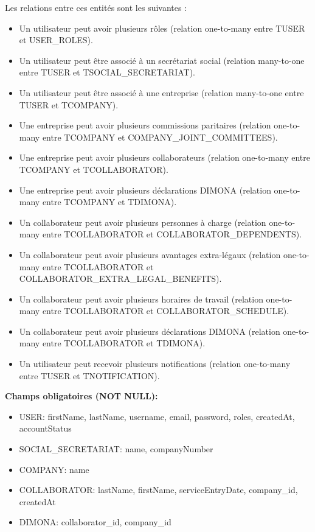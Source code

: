 \vspace{0.5cm}

\noindent Les relations entre ces entités sont les suivantes :

\begin{itemize}[leftmargin=*,label=\textcolor{darkgray}{$\bullet$},itemsep=0.3em]
  \item Un utilisateur peut avoir plusieurs rôles (relation one-to-many entre TUSER et USER\_ROLES).
  \item Un utilisateur peut être associé à un secrétariat social (relation many-to-one entre TUSER et TSOCIAL\_SECRETARIAT).
  \item Un utilisateur peut être associé à une entreprise (relation many-to-one entre TUSER et TCOMPANY).
  \item Une entreprise peut avoir plusieurs commissions paritaires (relation one-to-many entre TCOMPANY et COMPANY\_JOINT\_COMMITTEES).
  \item Une entreprise peut avoir plusieurs collaborateurs (relation one-to-many entre TCOMPANY et TCOLLABORATOR).
  \item Une entreprise peut avoir plusieurs déclarations DIMONA (relation one-to-many entre TCOMPANY et TDIMONA).
  \item Un collaborateur peut avoir plusieurs personnes à charge (relation one-to-many entre TCOLLABORATOR et COLLABORATOR\_DEPENDENTS).
  \item Un collaborateur peut avoir plusieurs avantages extra-légaux (relation one-to-many entre TCOLLABORATOR et COLLABORATOR\_EXTRA\_LEGAL\_BENEFITS).
  \item Un collaborateur peut avoir plusieurs horaires de travail (relation one-to-many entre TCOLLABORATOR et COLLABORATOR\_SCHEDULE).
  \item Un collaborateur peut avoir plusieurs déclarations DIMONA (relation one-to-many entre TCOLLABORATOR et TDIMONA).
  \item Un utilisateur peut recevoir plusieurs notifications (relation one-to-many entre TUSER et TNOTIFICATION).
\end{itemize}

\vspace{0.5cm}

\textbf{Champs obligatoires (NOT NULL):}
\begin{itemize}[leftmargin=*,label=\textcolor{darkgray}{$\bullet$},itemsep=0.3em]
  \item USER: firstName, lastName, username, email, password, roles, createdAt, accountStatus
  \item SOCIAL\_SECRETARIAT: name, companyNumber
  \item COMPANY: name
  \item COLLABORATOR: lastName, firstName, serviceEntryDate, company\_id, createdAt
  \item DIMONA: collaborator\_id, company\_id
\end{itemize}

